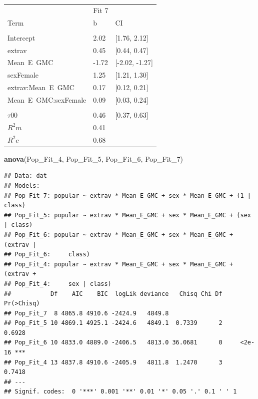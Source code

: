 \documentclass[]{article}
\newenvironment{Shaded}{\begin{snugshade}}{\end{snugshade}}
\newcommand{\KeywordTok}[1]{\textcolor[rgb]{0.13,0.29,0.53}{\textbf{#1}}}
\newcommand{\DecValTok}[1]{\textcolor[rgb]{0.00,0.00,0.81}{#1}}
\newcommand{\NormalTok}[1]{#1}
\begin{document}
\begin{tabular}{lll}
\toprule
\multicolumn{1}{c}{ } & \multicolumn{1}{c}{Fit 7} \\
\cmidrule(l{2pt}r{2pt}){2-2}
Term & b & CI\\
\midrule
\addlinespace[0.3em]
\multicolumn{3}{l}{\textbf{Fixed}}\\
\hspace{1em}Intercept & 2.02 & [1.76, 2.12]\\
\hspace{1em}extrav & 0.45 & [0.44, 0.47]\\
\hspace{1em}Mean\ E\ GMC & -1.72 & [-2.02, -1.27]\\
\hspace{1em}sexFemale & 1.25 & [1.21, 1.30]\\
\hspace{1em}extrav:Mean\ E\ GMC & 0.17 & [0.12, 0.21]\\
\hspace{1em}Mean\ E\ GMC:sexFemale & 0.09 & [0.03, 0.24]\\
\addlinespace[0.3em]
\multicolumn{3}{l}{\textbf{Random}}\\
\hspace{1em}$\tau {00}$ & 0.46 & [0.37, 0.63]\\
$R^2 m$ & 0.41 & \\
$R^2 c$ & 0.68 & \\
\bottomrule
\end{tabular}

\begin{Shaded}
\begin{Highlighting}[]
\KeywordTok{anova}\NormalTok{(Pop_Fit_}\DecValTok{4}\NormalTok{, Pop_Fit_}\DecValTok{5}\NormalTok{, Pop_Fit_}\DecValTok{6}\NormalTok{, Pop_Fit_}\DecValTok{7}\NormalTok{)}
\end{Highlighting}
\end{Shaded}

\begin{verbatim}
## Data: dat
## Models:
## Pop_Fit_7: popular ~ extrav * Mean_E_GMC + sex * Mean_E_GMC + (1 | class)
## Pop_Fit_5: popular ~ extrav * Mean_E_GMC + sex * Mean_E_GMC + (sex | class)
## Pop_Fit_6: popular ~ extrav * Mean_E_GMC + sex * Mean_E_GMC + (extrav | 
## Pop_Fit_6:     class)
## Pop_Fit_4: popular ~ extrav * Mean_E_GMC + sex * Mean_E_GMC + (extrav + 
## Pop_Fit_4:     sex | class)
##           Df    AIC    BIC  logLik deviance   Chisq Chi Df Pr(>Chisq)    
## Pop_Fit_7  8 4865.8 4910.6 -2424.9   4849.8                              
## Pop_Fit_5 10 4869.1 4925.1 -2424.6   4849.1  0.7339      2     0.6928    
## Pop_Fit_6 10 4833.0 4889.0 -2406.5   4813.0 36.0681      0     <2e-16 ***
## Pop_Fit_4 13 4837.8 4910.6 -2405.9   4811.8  1.2470      3     0.7418    
## ---
## Signif. codes:  0 '***' 0.001 '**' 0.01 '*' 0.05 '.' 0.1 ' ' 1
\end{verbatim}
\end{document}
